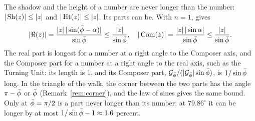 \begin{remark}\label{rem:gn-long-parts}
The shadow and the height of a number are never longer than the number: $|\operatorname{Sh}(z)| \le |z|$ and $|\operatorname{Ht}(z)| \le |z|$. Its parts can be. With $n = 1$,  gives
\[
|\Re(z)| = \frac{|z|\,|\sin(\bar{\phi} - \alpha)|}{\sin\bar{\phi}} \le \frac{|z|}{\sin\bar{\phi}} , \quad |\operatorname{Com}(z)| = \frac{|z|\,|\sin\alpha|}{\sin\bar{\phi}} \le \frac{|z|}{\sin\bar{\phi}} .
\]
The real part is longest for a number at a right angle to the Composer axis, and the Composer part for a number at a right angle to the real axis, such as the Turning Unit: its length is $1$, and its Composer part, $\mathcal{G}_{\bar{\phi}}/(|\mathcal{G}_{\bar{\phi}}|\sin\bar{\phi})$, is $1/\sin\bar{\phi}$ long. In the triangle of the walk, the corner between the two parts has the angle $\pi - \bar{\phi}$ or $\bar{\phi}$ (Remark~\ref{rem:corner}), and the law of sines gives the same bound. Only at $\bar{\phi} = \pi/2$ is a part never longer than its number; at $79.86^\circ$ it can be longer by at most $1/\sin\bar{\phi} - 1 \approx 1.6$ percent.
\end{remark}

